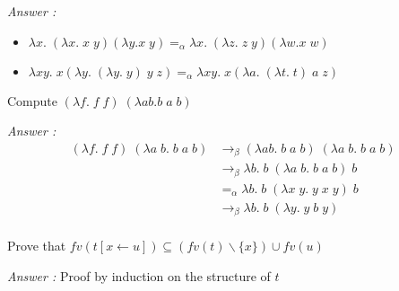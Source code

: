   \textit{Answer :}
    \begin{itemize}
      \item $\lambda x.\; (\lambda x.\; x\; y) (\lambda y. x\; y) =_\alpha
        \lambda x.\; (\lambda z.\; z\; y) (\lambda w. x\; w)$
      \item $\lambda x y.\; x (\lambda y.\; (\lambda y.\; y)\; y\; z) =_\alpha
        \lambda x y.\; x (\lambda a.\; (\lambda t.\; t)\; a\; z)$
    \end{itemize}

  \exo Compute $(\lambda f.\; f\;f)\; (\lambda a b. b\;a\;b)$

  \textit{Answer :}
    \begin{align*}
      (\lambda f.\;f\;f)\; (\lambda a\; b.\;b\;a\;b) &\to_\beta
      (\lambda a b.\;b\;a\;b)\; (\lambda a\;b.\;b\;a\;b) \\
      &\to_\beta \lambda b.\;b\;(\lambda a\;b.\;b\;a\;b)\;b\\
      &=_\alpha \lambda b.\;b\;(\lambda x\;y.\;y\;x\;y)\;b\\
      &\to_\beta \lambda b.\;b\;(\lambda y.\;y\;b\;y)\\
    \end{align*}


  \exo Prove that $fv(t[x \leftarrow u]) \subseteq (fv(t) \backslash \{x\})
    \cup fv(u)$

  \textit{Answer :} Proof by induction on the structure of $t$

